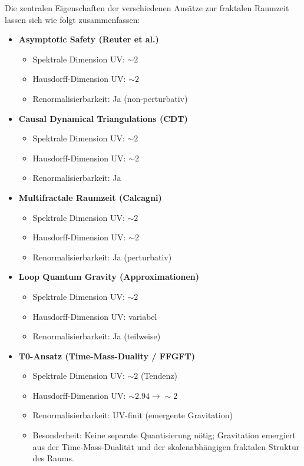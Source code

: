 	Die zentralen Eigenschaften der verschiedenen Ansätze zur fraktalen Raumzeit lassen sich wie folgt zusammenfassen:
	
	\begin{itemize}
		\item \textbf{Asymptotic Safety (Reuter et al.)}
		\begin{itemize}
			\item Spektrale Dimension UV: $\sim 2$
			\item Hausdorff-Dimension UV: $\sim 2$
			\item Renormalisierbarkeit: Ja (non-perturbativ)
		\end{itemize}
		
		\item \textbf{Causal Dynamical Triangulations (CDT)}
		\begin{itemize}
			\item Spektrale Dimension UV: $\sim 2$
			\item Hausdorff-Dimension UV: $\sim 2$
			\item Renormalisierbarkeit: Ja
		\end{itemize}
		
		\item \textbf{Multifractale Raumzeit (Calcagni)}
		\begin{itemize}
			\item Spektrale Dimension UV: $\sim 2$
			\item Hausdorff-Dimension UV: $\sim 2$
			\item Renormalisierbarkeit: Ja (perturbativ)
		\end{itemize}
		
		\item \textbf{Loop Quantum Gravity (Approximationen)}
		\begin{itemize}
			\item Spektrale Dimension UV: $\sim 2$
			\item Hausdorff-Dimension UV: variabel
			\item Renormalisierbarkeit: Ja (teilweise)
		\end{itemize}
		
		\item \textbf{T0-Ansatz (Time-Mass-Duality / FFGFT)}
		\begin{itemize}
			\item Spektrale Dimension UV: $\sim 2$ (Tendenz)
			\item Hausdorff-Dimension UV: $\sim 2.94 \rightarrow \sim 2$
			\item Renormalisierbarkeit: UV-finit (emergente Gravitation)
			\item Besonderheit: Keine separate Quantisierung nötig; Gravitation emergiert aus der Time-Mass-Dualität und der skalenabhängigen fraktalen Struktur des Raums.
		\end{itemize}
	\end{itemize}
	

